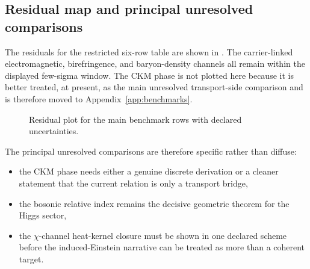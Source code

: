 \subsection{Residual map and principal unresolved comparisons}

The residuals for the restricted six-row table are shown in . The carrier-linked electromagnetic, birefringence, and baryon-density channels all remain within the displayed few-sigma window. The CKM phase is not plotted here because it is better treated, at present, as the main unresolved transport-side comparison and is therefore moved to Appendix~\ref{app:benchmarks}.

\begin{figure}[t]
\centering
{}
\caption{Residual plot for the main benchmark rows with declared uncertainties.}
\label{fig:residual-plot}
\end{figure}

The principal unresolved comparisons are therefore specific rather than diffuse:
\begin{itemize}[leftmargin=1.5em, topsep=3pt, itemsep=2pt]
    \item the CKM phase needs either a genuine discrete derivation or a cleaner statement that the current relation is only a transport bridge,
    \item the bosonic relative index remains the decisive geometric theorem for the Higgs sector,
    \item the $\chi$-channel heat-kernel closure must be shown in one declared scheme before the induced-Einstein narrative can be treated as more than a coherent target.
\end{itemize}

